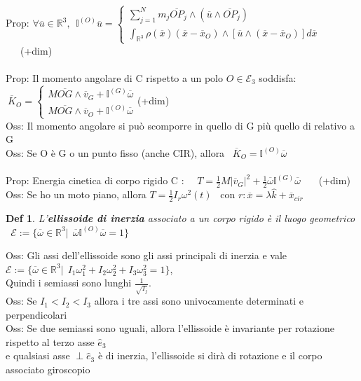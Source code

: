 \documentclass{article}
\theoremstyle{unnumbered}
\newtheorem* {theoremT}{Def}
\theoremstyle{unnumbered1}
\newenvironment{defi}{\begin{gBox}\begin{theoremT}}{\end{theoremT}\end{gBox}}
\begin{document}
%
%
Prop: $\forall \overline{u}\in\mathbb{R}^3, \ \ \mathbb{I}^{(O)}\overline{u}=\begin{cases}
\sum_{j=1}^N m_j\overline{OP}_j \wedge (\overline{u}\wedge\overline{OP}_j)\\
\int_{\mathbb{R}^3}\rho(\overline{x})(\overline{x} - \overline{x}_O)\wedge[\overline{u}\wedge(\overline{x}-\overline{x}_O)]d\overline{x}\end{cases}$ \ \ \ (+dim)\\ \\
%
%
Prop: Il momento angolare di C rispetto a un polo $O\in\mathcal{E}_3$ soddisfa: $\ \overline{K}_O=\begin{cases} M\overline{OG}\wedge\overline{v}_G +\mathbb{I}^{(G)}\overline{\omega} \\ M\overline{OG}\wedge\overline{v}_O +\mathbb{I}^{(O)}\overline{\omega} \end{cases}$(+dim) \\
Oss: Il momento angolare si può scomporre in quello di G più quello di relativo a G \\
Oss: Se O è G o un punto fisso (anche CIR), allora \ $\overline{K}_O=\mathbb{I}^{(O)}\overline{\omega}$ \\ \\
%
%
%
Prop: Energia cinetica di corpo rigido C : \ \ $T=\frac{1}{2}M|\overline{v}_G|^2 + \frac{1}{2}\overline{\omega}\mathbb{I}^{(G)}\overline{\omega}$ \ \ \ (+dim)\\
Oss: Se ho un moto piano, allora $T=\frac{1}{2}I_r\omega^2(t)$ \ con $r: \overline{x}=\lambda\hat{k}+\overline{x}_{cir}$
%
%
%
\begin{defi}
L'\textbf{ellissoide di inerzia} associato a un corpo rigido è il luogo geometrico \ $\mathcal{E}:=\{\overline{\omega} \in \mathbb{R}^3 |\ \ \overline{\omega}\mathbb{I}^{(O)}\overline{\omega} =1\}$
\end{defi}
%
Oss: Gli assi dell'ellissoide sono gli assi principali di inerzia e vale \ $\mathcal{E}:=\{\overline{\omega} \in \mathbb{R}^3 |\ \ I_1\omega_1^2 + I_2\omega_2^2 + I_3\omega_3^2 =1\}$, \\
\phantom{Oss: }Quindi i semiassi sono lunghi $\frac{1}{\sqrt{I_j}}$.\\
%
Oss: Se $I_1<I_2<I_3$ allora i tre assi sono univocamente determinati e perpendicolari\\
%
Oss: Se due semiassi sono uguali, allora l'ellissoide è invariante per rotazione rispetto al terzo asse $\hat{e}_3$\\
\phantom{Oss: }e qualsiasi asse $\perp \hat{e}_3$ è di inerzia, l'ellissoide si dirà di rotazione e il corpo associato giroscopio\\
\end{document}
